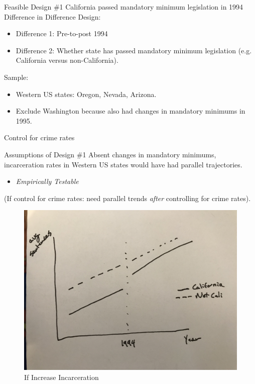 \documentclass[11pt]{beamer}
\begin{document}
\begin{frame}[c]{Feasible Design \#1}
California passed mandatory minimum legislation in 1994\\
\pause
\vspace{1cm}
Difference in Difference Design:
\begin{itemize}
    \item Difference 1: Pre-to-post 1994
    \item Difference 2: Whether state has passed mandatory minimum legislation (e.g. California versus non-California).
\end{itemize}
\pause Sample:
\begin{itemize}
    \item Western US states: Oregon, Nevada, Arizona.
    \item Exclude Washington because also had changes in mandatory minimums in 1995.
\end{itemize}
\pause
Control for crime rates
\end{frame}


\begin{frame}[c]{Assumptions of Design \#1}
Absent changes in mandatory minimums, incarceration rates in Western US states would have had parallel trajectories.
\begin{itemize}
    \item \emph{Empirically Testable}
\end{itemize}
\pause (If control for crime rates: need parallel trends \emph{after} controlling for crime rates).
\end{frame}

\begin{frame}[c]{}

\begin{figure}
    \centering
    \caption{If Increase Incarceration}\label{}
\includegraphics[width=\textwidth]{if_effect.jpg}
\end{figure}

\end{frame}
\end{document}
